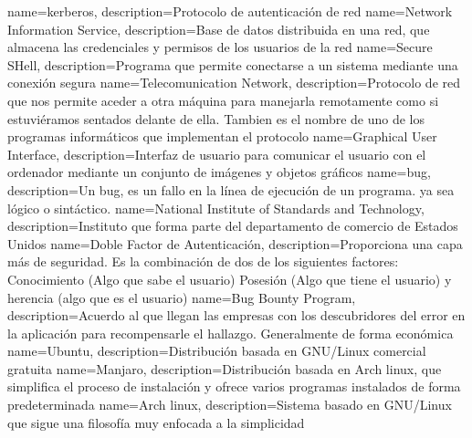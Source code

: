 {
	name=kerberos,
	description={Protocolo de autenticación de red}
}
{
	name=Network Information Service,
	description={Base de datos distribuida en una red, que almacena las credenciales y permisos de los usuarios de la red}
}
{
	name=Secure SHell,
	description={Programa que permite conectarse a un sistema mediante una conexión segura}
}
{
	name=Telecomunication Network,
	description={Protocolo de red que nos permite aceder a otra máquina para manejarla remotamente como si estuviéramos sentados delante de ella. Tambien es el nombre de uno de los programas informáticos que implementan el protocolo}
}
{
	name=Graphical User Interface,
	description={Interfaz de usuario para comunicar el usuario con el ordenador mediante un conjunto de imágenes y objetos gráficos}
}
{
	name=bug,
	description={Un bug, es un fallo en la línea de ejecución de un programa. ya sea lógico o sintáctico.}
}
{
	name=National Institute of Standards and Technology,
	description={Instituto que forma parte del departamento de comercio de Estados Unidos}
}
{
	name=Doble Factor de Autenticación,
	description={Proporciona una capa más de seguridad. Es la combinación de dos de los siguientes factores: Conocimiento (Algo que sabe el usuario) Posesión (Algo que tiene el usuario) y herencia (algo que es el usuario)}
}
{
	name=Bug Bounty Program,
	description={Acuerdo al que llegan las empresas con los descubridores del error en la aplicación para recompensarle el hallazgo. Generalmente de forma económica}
}
{
	name=Ubuntu,
	description={Distribución basada en GNU/Linux comercial gratuita}
}
{
	name=Manjaro,
	description={Distribución basada en Arch linux, que simplifica el proceso de instalación y ofrece varios programas instalados de forma predeterminada}
}
{
	name=Arch linux,
	description={Sistema basado en GNU/Linux que sigue una filosofía muy enfocada a la simplicidad}
}
